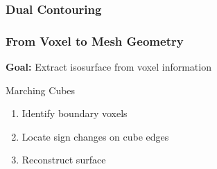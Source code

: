
\subsubsection{Dual Contouring}

\begin{frame}
	\frametitle{From Voxel to Mesh Geometry}
	\vspace{-0.8cm}
	\begin{center}
	\textbf{Goal:} Extract isosurface from voxel information	
	\end{center}
\vspace{-0.5cm}	
\begin{minipage}[t]{0.4\linewidth}
		\begin{block}{Marching Cubes}
	\begin{enumerate}
		\item<2-> Identify boundary voxels
		\item<3-> Locate sign changes on cube edges
		\item<4-> Reconstruct surface
	\end{enumerate}
	

\end{block}
\end{minipage}
\end{frame}
